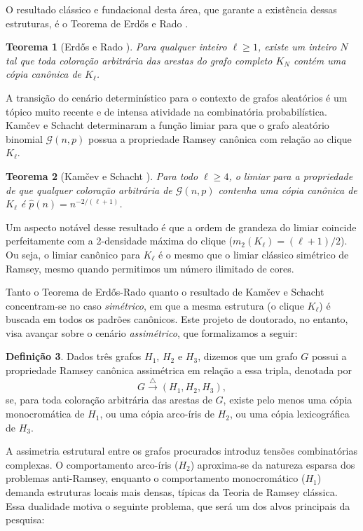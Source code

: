 \documentclass[reqno, 12pt]{amsart}
\numberwithin{equation}{section}
\theoremstyle{definition}
\newtheorem{definition}{Definição}[section]
\theoremstyle{plain}
\newtheorem{theorem}[definition]{Teorema}
\begin{document}
O resultado clássico e fundacional desta área, que garante a existência dessas estruturas, é o Teorema de Erdős e Rado \cite{erdos1950combinatorial}.

\begin{theorem}[Erdős e Rado \cite{erdos1950combinatorial}]
Para qualquer inteiro $\ell\geq 1$, existe um inteiro $N$ tal que toda coloração arbitrária das arestas do grafo completo $K_N$ contém uma cópia canônica de $K_\ell$.
\end{theorem}

A transição do cenário determinístico para o contexto de grafos aleatórios é um tópico muito recente e de intensa atividade na combinatória probabilística. Kamčev e Schacht \cite{kamvcev2023canonical} determinaram a função limiar para que o grafo aleatório binomial $\mathcal{G}(n,p)$ possua a propriedade Ramsey canônica com relação ao clique $K_\ell$.

\begin{theorem}[Kamčev e Schacht \cite{kamvcev2023canonical}]
Para todo $\ell \ge 4$, o limiar para a propriedade de que qualquer coloração arbitrária de $\mathcal{G}(n,p)$ contenha uma cópia canônica de $K_\ell$ é $\widehat{p}(n) = n^{-2/(\ell+1)}$.
\end{theorem}

Um aspecto notável desse resultado é que a ordem de grandeza do limiar coincide perfeitamente com a 2-densidade máxima do clique ($m_2(K_\ell) = (\ell+1)/2$). Ou seja, o limiar canônico para $K_\ell$ é o mesmo que o limiar clássico simétrico de Ramsey, mesmo quando permitimos um número ilimitado de cores.

Tanto o Teorema de Erdős-Rado quanto o resultado de Kamčev e Schacht concentram-se no caso \emph{simétrico}, em que a mesma estrutura (o clique $K_\ell$) é buscada em todos os padrões canônicos. Este projeto de doutorado, no entanto, visa avançar sobre o cenário \emph{assimétrico}, que formalizamos a seguir:

\begin{definition}
Dados três grafos $H_1$, $H_2$ e $H_3$, dizemos que um grafo $G$ possui a propriedade Ramsey canônica assimétrica em relação a essa tripla, denotada por
\[
G \xrightarrow{\triangle} (H_1, H_2, H_3),
\]
se, para toda coloração arbitrária das arestas de $G$, existe pelo menos uma cópia monocromática de $H_1$, ou uma cópia arco-íris de $H_2$, ou uma cópia lexicográfica de $H_3$.
\end{definition}

A assimetria estrutural entre os grafos procurados introduz tensões combinatórias complexas. O comportamento arco-íris ($H_2$) aproxima-se da natureza esparsa dos problemas anti-Ramsey, enquanto o comportamento monocromático ($H_1$) demanda estruturas locais mais densas, típicas da Teoria de Ramsey clássica. Essa dualidade motiva o seguinte problema, que será um dos alvos principais da pesquisa:
\end{document}
